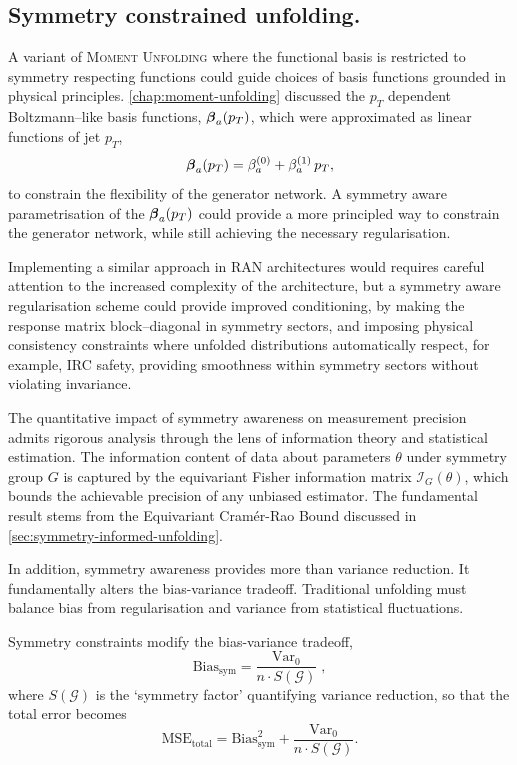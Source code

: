     \subsection{Symmetry constrained unfolding.}
        A variant of \textsc{Moment Unfolding} where the functional basis is restricted to symmetry respecting functions could guide choices of basis functions grounded in physical principles.
        \cref{chap:moment-unfolding} discussed the \(p_T\) dependent Boltzmann--like basis functions, \(\vb*{\beta}_a(p_T)\), which were approximated as linear functions of jet \(p_T\),
        \[
            \vb*{\beta}_a(p_T) = {\beta}_a^{(0)} + {\beta}_a^{(1)}\,p_T,
        \]
        to constrain the flexibility of the generator network.
        A symmetry aware parametrisation of the \(\vb*{\beta}_a(p_T)\) could provide a more principled way to constrain the generator network, while still achieving the necessary regularisation.
        
        Implementing a similar approach in RAN architectures would requires careful attention to the increased complexity of the architecture, but a symmetry aware regularisation scheme could provide improved conditioning, by making the response matrix block--diagonal in symmetry sectors, and imposing physical consistency constraints where unfolded distributions automatically respect, for example, IRC safety, providing smoothness within symmetry sectors without violating invariance.

        The quantitative impact of symmetry awareness on measurement precision admits rigorous analysis through the lens of information theory and statistical estimation.
        The information content of data about parameters \(\theta\) under symmetry group \(G\) is captured by the equivariant Fisher information matrix \(\mathcal{I}_G(\theta)\), which bounds the achievable precision of any unbiased estimator.
        The fundamental result stems from the Equivariant Cramér-Rao Bound discussed in \cref{sec:symmetry-informed-unfolding}.
        
        In addition, symmetry awareness provides more than variance reduction.
        It fundamentally alters the bias-variance tradeoff.
        Traditional unfolding must balance bias from regularisation and variance from statistical fluctuations.
        
        Symmetry constraints modify the bias-variance tradeoff,
        \[
            \text{Bias}_{\text{sym}} = \frac{\text{Var}_0}{n \cdot S(\mathcal{G})}\;,
        \]
        where \(S(\mathcal{G})\) is the `symmetry factor' quantifying variance reduction, so that the total error becomes
        \[
            \text{MSE}_{\text{total}} = \text{Bias}_{\text{sym}}^2 + \frac{\text{Var}_0}{n \cdot S(\mathcal{G})}.
        \]
        
